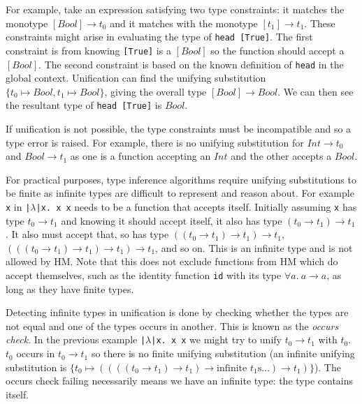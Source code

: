 \documentclass[a4paper,fleqn,oneside,12pt]{report}
\begin{document}
For example, take an expression satisfying two type constraints: it matches the monotype $[Bool] \rightarrow t_0$ and it matches with the monotype $[t_1] \rightarrow t_1$. These constraints might arise in evaluating the type of \texttt{head [True]}. The first constraint is from knowing \texttt{[True]} is a $[Bool]$ so the function should accept a $[Bool]$. The second constraint is based on the known definition of \texttt{head} in the global context. Unification can find the unifying substitution $\{ t_0 \mapsto Bool, t_1 \mapsto Bool \}$, giving the overall type $[Bool] \rightarrow Bool$. We can then see the resultant type of \texttt{head [True]} is $Bool$.

If unification is not possible, the type constraints must be incompatible and so a type error is raised. For example, there is no unifying substitution for $Int \rightarrow t_0$ and $Bool \rightarrow t_1$ as one is a function accepting an $Int$ and the other accepts a $Bool$.

For practical purposes, type inference algorithms require unifying substitutions to be finite as infinite types are difficult to represent and reason about. For example \texttt{x} in \texttt{|$\lambda$|x. x x} needs to be a function that accepts itself. Initially assuming \texttt{x} has type $t_0 \rightarrow t_1$ and knowing it should accept itself, it also has type $(t_0 \rightarrow t_1) \rightarrow t_1$. It also must accept that, so has type $((t_0 \rightarrow t_1) \rightarrow t_1) \rightarrow t_1$, $(((t_0 \rightarrow t_1) \rightarrow t_1) \rightarrow t_1) \rightarrow t_1$, and so on. This is an infinite type and is not allowed by HM. Note that this does not exclude functions from HM which do accept themselves, such as the identity function \texttt{id} with its type $\forall a.\ a \rightarrow a$, as long as they have finite types.

Detecting infinite types in unification is done by checking whether the types are not equal and one of the types occurs in another. This is known as the \textit{occurs check}. In the previous example \texttt{|$\lambda$|x. x x} we might try to unify $t_0 \rightarrow t_1$ with $t_0$. $t_0$ occurs in $t_0 \rightarrow t_1$ so there is no finite unifying substitution (an infinite unifying substitution is $\{ t_0 \mapsto ((((t_0 \rightarrow t_1) \rightarrow t_1) \rightarrow \textrm{infinite }t_1\textrm{s} \dots) \rightarrow t_1) \}$). The occurs check failing necessarily means we have an infinite type: the type contains itself.
\end{document}
